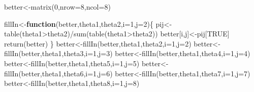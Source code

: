 \documentclass[
]{book}
\newenvironment{Shaded}{\begin{snugshade}}{\end{snugshade}}
\newcommand{\AttributeTok}[1]{\textcolor[rgb]{0.77,0.63,0.00}{#1}}
\newcommand{\ControlFlowTok}[1]{\textcolor[rgb]{0.13,0.29,0.53}{\textbf{#1}}}
\newcommand{\DecValTok}[1]{\textcolor[rgb]{0.00,0.00,0.81}{#1}}
\newcommand{\FunctionTok}[1]{\textcolor[rgb]{0.00,0.00,0.00}{#1}}
\newcommand{\NormalTok}[1]{#1}
\newcommand{\OtherTok}[1]{\textcolor[rgb]{0.56,0.35,0.01}{#1}}
\newcommand{\SpecialCharTok}[1]{\textcolor[rgb]{0.00,0.00,0.00}{#1}}
\newcommand{\StringTok}[1]{\textcolor[rgb]{0.31,0.60,0.02}{#1}}
\theoremstyle{definition}
\theoremstyle{definition}
\theoremstyle{definition}
\theoremstyle{definition}
\theoremstyle{remark}
\begin{document}
\begin{Shaded}
\begin{Highlighting}[]
\NormalTok{  better}\OtherTok{\textless{}{-}}\FunctionTok{matrix}\NormalTok{(}\DecValTok{0}\NormalTok{,}\AttributeTok{nrow=}\DecValTok{8}\NormalTok{,}\AttributeTok{ncol=}\DecValTok{8}\NormalTok{)}
  
\NormalTok{  fillIn}\OtherTok{\textless{}{-}}\ControlFlowTok{function}\NormalTok{(better,theta1,theta2,}\AttributeTok{i=}\DecValTok{1}\NormalTok{,}\AttributeTok{j=}\DecValTok{2}\NormalTok{)\{}
\NormalTok{   pij}\OtherTok{\textless{}{-}}\FunctionTok{table}\NormalTok{(theta1}\SpecialCharTok{\textgreater{}}\NormalTok{theta2)}\SpecialCharTok{/}\FunctionTok{sum}\NormalTok{(}\FunctionTok{table}\NormalTok{(theta1}\SpecialCharTok{\textgreater{}}\NormalTok{theta2))}
\NormalTok{   better[i,j]}\OtherTok{\textless{}{-}}\NormalTok{pij[}\StringTok{\textquotesingle{}TRUE\textquotesingle{}}\NormalTok{]}
  \FunctionTok{return}\NormalTok{(better)}
\NormalTok{  \}}
\NormalTok{  better}\OtherTok{\textless{}{-}}\FunctionTok{fillIn}\NormalTok{(better,theta1,theta2,}\AttributeTok{i=}\DecValTok{1}\NormalTok{,}\AttributeTok{j=}\DecValTok{2}\NormalTok{)}
\NormalTok{  better}\OtherTok{\textless{}{-}}\FunctionTok{fillIn}\NormalTok{(better,theta1,theta3,}\AttributeTok{i=}\DecValTok{1}\NormalTok{,}\AttributeTok{j=}\DecValTok{3}\NormalTok{)}
\NormalTok{  better}\OtherTok{\textless{}{-}}\FunctionTok{fillIn}\NormalTok{(better,theta1,theta4,}\AttributeTok{i=}\DecValTok{1}\NormalTok{,}\AttributeTok{j=}\DecValTok{4}\NormalTok{)}
\NormalTok{  better}\OtherTok{\textless{}{-}}\FunctionTok{fillIn}\NormalTok{(better,theta1,theta5,}\AttributeTok{i=}\DecValTok{1}\NormalTok{,}\AttributeTok{j=}\DecValTok{5}\NormalTok{)}
\NormalTok{  better}\OtherTok{\textless{}{-}}\FunctionTok{fillIn}\NormalTok{(better,theta1,theta6,}\AttributeTok{i=}\DecValTok{1}\NormalTok{,}\AttributeTok{j=}\DecValTok{6}\NormalTok{)}
\NormalTok{  better}\OtherTok{\textless{}{-}}\FunctionTok{fillIn}\NormalTok{(better,theta1,theta7,}\AttributeTok{i=}\DecValTok{1}\NormalTok{,}\AttributeTok{j=}\DecValTok{7}\NormalTok{)}
\NormalTok{  better}\OtherTok{\textless{}{-}}\FunctionTok{fillIn}\NormalTok{(better,theta1,theta8,}\AttributeTok{i=}\DecValTok{1}\NormalTok{,}\AttributeTok{j=}\DecValTok{8}\NormalTok{)}
  

\end{Highlighting}
\end{Shaded}
\end{document}

